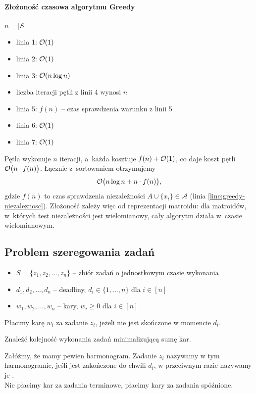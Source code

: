 \paragraph{Złożoność czasowa algorytmu Greedy}
$n = |S|$
\begin{itemize}[nosep]
	\item linia 1: $\mathcal{O}(1)$
	\item linia 2: $\mathcal{O}(1)$
	\item linia 3: $\mathcal{O}(n \log n)$
	\item liczba iteracji pętli z linii 4 wynosi $n$
	\item linia 5: $f(n)$ -- czas sprawdzenia warunku z linii 5
	\item linia 6: $\mathcal{O}(1)$
	\item linia 7: $\mathcal{O}(1)$
\end{itemize}
Pętla wykonuje $n$ iteracji, a~każda kosztuje $f(n) + \mathcal{O}(1)$, co daje koszt pętli $\mathcal{O}\bigl(n \cdot f(n)\bigr)$. Łącznie z~sortowaniem otrzymujemy
\[
	\mathcal{O}\bigl(n \log n + n \cdot f(n)\bigr),
\]
gdzie $f(n)$ to czas sprawdzenia niezależności $A \cup \{x_i\} \in \mathcal{A}$ (linia \ref{line:greedy-niezaleznosc}). Złożoność zależy więc od reprezentacji matroidu: dla matroidów, w~których test niezależności jest wielomianowy, cały algorytm działa w~czasie wielomianowym.

\subsection{Problem szeregowania zadań}

\begin{itemize}[nosep]
	\item $S = \{z_1, z_2, \ldots, z_n\}$ -- zbiór zadań o jednostkowym czasie wykonania
	\item $d_1, d_2, \ldots, d_n$ -- deadliny, $d_i \in \{1, \ldots, n\}$ dla $i \in [n]$
	\item $w_1, w_2, \ldots, w_n$ -- kary, $w_i \geq 0$ dla $i \in [n]$
\end{itemize}
Płacimy karę $w_i$ za zadanie $z_i$, jeżeli nie jest skończone w momencie $d_i$.\\
\begin{problem}
	Znaleźć kolejność wykonania zadań minimalizującą sumę kar.
\end{problem}

Załóżmy, że mamy pewien harmonogram. Zadanie $z_i$ nazywamy  w tym harmonogramie, jeśli jest zakończone do chwili $d_i$, w przeciwnym razie nazywamy je .\\
Nie płacimy kar za zadania terminowe, płacimy kary za zadania spóźnione.

